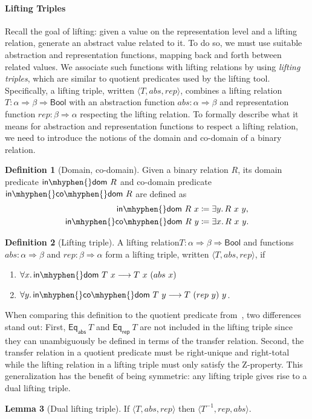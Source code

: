 \documentclass{article}
\theoremstyle{definition}
\newtheorem{definition}{Definition}[section]
\newtheorem{lemma}[definition]{Lemma}
\newcommand{\inv}{^{-1}}
\newcommand{\indom}{\mathsf{in\mhyphen{}dom}}
\newcommand{\incodom}{\mathsf{in\mhyphen{}co\mhyphen{}dom}}
\newcommand{\bool}{\mathsf{Bool}}
\newcommand{\eqrep}{\mathsf{Eq_{rep}}}
\newcommand{\eqabs}{\mathsf{Eq_{abs}}}
\newcommand{\liftrel}{lifting relation\xspace}
\newcommand{\liftrels}{lifting relations\xspace}
\begin{document}
\paragraph{Lifting Triples}
Recall the goal of lifting:
given a value on the representation level and a \liftrel,
generate an abstract value related to it.
To do so, we must use suitable abstraction and representation functions,
mapping back and forth between related values.
We associate such functions with \liftrels by using \emph{lifting triples},
which are similar to quotient predicates used by the lifting tool.
Specifically, a lifting triple,
written \(\langle T, abs, rep \rangle\),
combines a
lifting relation \(T : \alpha \Rightarrow \beta \Rightarrow \bool\) with an abstraction function \(abs : \alpha \Rightarrow \beta\) and representation function \(rep : \beta \Rightarrow \alpha\) respecting the
lifting relation.
To formally describe what it means for abstraction and representation functions to respect a \liftrel,
we need to introduce the notions of the domain and co-domain of a binary relation.
\begin{definition}[Domain, co-domain]
	Given a binary relation \(R\), its domain predicate \(\indom\ R\) and co-domain predicate \(\incodom\ R\) are defined as
	\begin{align*}
		\indom\ R\ x &\coloneqq \exists y\ldotp R\ x\ y, \\
		\incodom\ R\ y &\coloneqq \exists x\ldotp R\ x\ y.
	\end{align*}
\end{definition}
\begin{definition}[Lifting triple]\label{def-lifting-triple}
	A \liftrel \(T : \alpha \Rightarrow \beta \Rightarrow \bool\) and functions \(abs : \alpha \Rightarrow \beta\) and \(rep : \beta \Rightarrow \alpha\) form a lifting triple, written \(\langle T, abs, rep \rangle\), if
	\begin{enumerate}
    \item $\forall x\ldotp \indom\ T\ x \longrightarrow T\ x\ (abs\ x)$
    \item $\forall y\ldotp \incodom\ T\ y \longrightarrow T\ (rep\ y)\ y$.
	\end{enumerate}
\end{definition}
When comparing this definition to the quotient predicate from~\cite{huffman2013lifting},
two differences stand out:
First, \(\eqabs\ T\) and \(\eqrep\ T\) are not included in the lifting triple since they can unambiguously be defined in terms of the transfer relation.
Second, the transfer relation in a quotient predicate must be right-unique and right-total while the lifting relation in a lifting triple must only satisfy the Z-property.
This generalization has the benefit of being symmetric:
any lifting triple gives rise to a dual lifting triple.
\begin{lemma}[Dual lifting triple]\label{dual-lifting-triple}
  If $\langle T, abs, rep \rangle$ then $\langle T\inv, rep, abs \rangle$.
\end{lemma}
\end{document}
